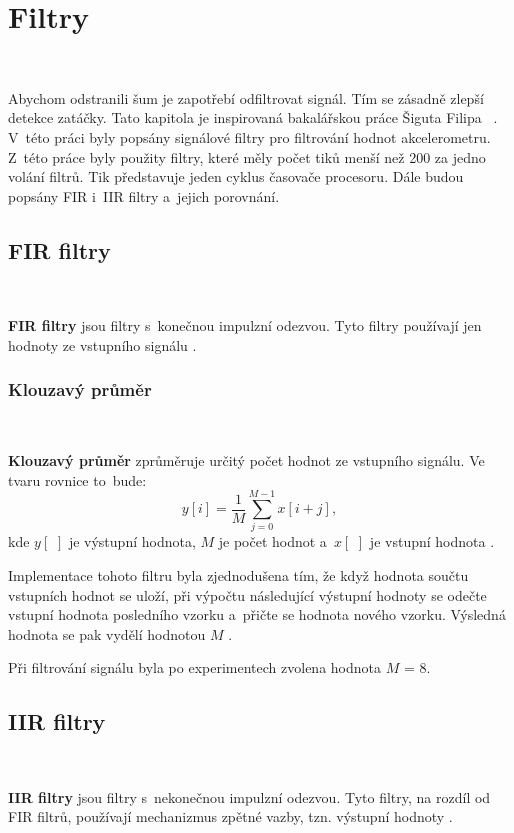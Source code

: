 \chapter{Filtry}
\label{sec:Filters}\

Abychom odstranili šum je zapotřebí odfiltrovat signál. Tím se zásadně zlepší
detekce zatáčky. Tato kapitola je inspirovaná bakalářskou práce Šiguta Filipa
~\cite{krokomer}. V~této práci byly popsány 
signálové filtry pro filtrování hodnot akcelerometru. Z~této práce byly použity 
filtry, které měly počet tiků menší než 200 za jedno volání filtrů. Tik představuje jeden cyklus časovače procesoru. Dále budou popsány FIR i~IIR filtry a~jejich porovnání.

\section{FIR filtry}\

\textbf{FIR filtry} jsou filtry s~konečnou impulzní odezvou. Tyto filtry používají
jen hodnoty ze vstupního signálu \cite{FIR}.

\subsection{Klouzavý průměr}\

\textbf{Klouzavý průměr} zprůměruje určitý počet hodnot ze vstupního signálu. Ve
tvaru rovnice to~bude:
\begin{equation}
y[i] = \frac{1}{M}\sum_{j = 0}^{M - 1}x[i+j],
\end{equation}
kde $y[\,\,]$ je výstupní hodnota, $M$ je počet hodnot a~$x[\,\,]$ je vstupní
hodnota \cite{Filters}.

Implementace tohoto filtru byla zjednodušena tím, že když hodnota součtu vstupních
hodnot se uloží, při výpočtu následující výstupní hodnoty se odečte vstupní hodnota
posledního vzorku a~přičte se hodnota nového vzorku. Výsledná hodnota se pak vydělí
hodnotou $M$ \cite{krokomer}.

Při filtrování signálu byla po experimentech zvolena hodnota $M$ = 8.

\section{IIR filtry}\

\textbf{IIR filtry} jsou filtry s~nekonečnou impulzní odezvou. Tyto filtry, 
na rozdíl od FIR filtrů, používají mechanizmus zpětné vazby, tzn. výstupní
hodnoty \cite{IIR}.

